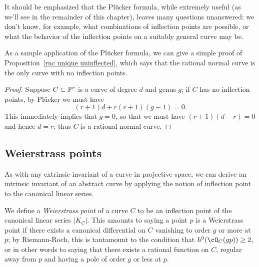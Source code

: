 It should be emphasized that the Pl\"ucker formula, while extremely useful (as we'll see in the remainder of this chapter), leaves many questions unanswered: we don't know, for example, what combinations of inflection points are possible, or what the behavior of the inflection points on a suitably general curve may be.

As a sample application of the Pl\"ucker formula, we can give a simple proof of Proposition~\ref{rnc unique uninflected}, which says that the rational normal curve is the only curve with no inflection points. 

\begin{proof}
Suppose $C \subset \PP^r$ is a curve of degree $d$ and genus $g$; if $C$ has no inflection points, by Pl\"ucker we must have
$$
(r+1)d + r(r+1)(g-1) = 0.
$$
This immediately implies that $g=0$, so that we must have $(r+1)(d-r) = 0$ and hence $d=r$; thus $C$ is a rational normal curve.
\end{proof}

\subsection{Weierstrass points}

As with any extrinsic invariant of a curve in projective space, we can derive an intrinsic invariant of an abstract curve by applying the notion of inflection point to the canonical linear series. 

We define a \emph{Weierstrass point} of a curve $C$ to be an inflection point of the canonical linear series $|K_C|$. This amounts to saying a point $p$ is a Weierstrass point if there exists a canonical differential on $C$ vanishing to order $g$ or more at $p$; by Riemann-Roch, this is tantamount to the condition that $h^0(\cO_C(gp)) \geq 2$, or in other words to saying that there exists a rational function on $C$, regular away from $p$ and having a pole of order $g$ or less at $p$.

